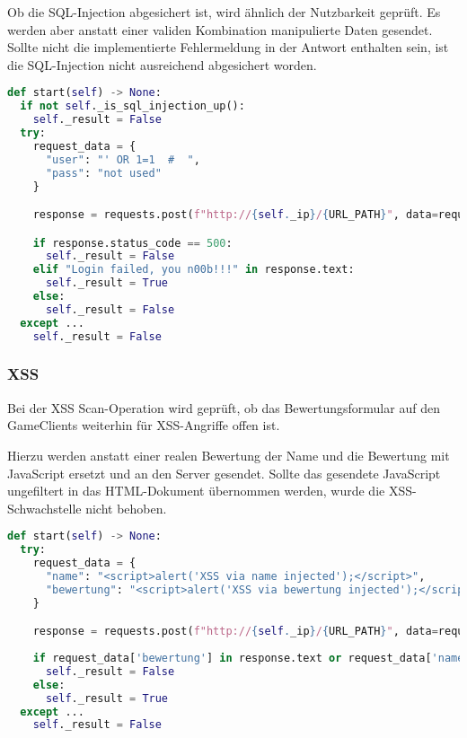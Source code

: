 Ob die SQL-Injection abgesichert ist, wird ähnlich der Nutzbarkeit geprüft. Es werden aber anstatt einer validen Kombination manipulierte Daten gesendet. Sollte nicht die implementierte Fehlermeldung  in der Antwort enthalten sein, ist die SQL-Injection nicht ausreichend abgesichert worden.

\begin{lstlisting}[language=Python, frame=single, caption={Big Brother SQL-Injection Save}, captionpos=b, label={lst:bigbrother-sql-injection-save}]
def start(self) -> None:
  if not self._is_sql_injection_up():
    self._result = False
  try:
    request_data = {
      "user": "' OR 1=1  #  ",
      "pass": "not used"
    }

    response = requests.post(f"http://{self._ip}/{URL_PATH}", data=request_data)

    if response.status_code == 500:
      self._result = False
    elif "Login failed, you n00b!!!" in response.text:
      self._result = True
    else:
      self._result = False
  except ...
    self._result = False
\end{lstlisting}

\subsubsection{XSS}
Bei der XSS Scan-Operation wird geprüft, ob das Bewertungsformular auf den GameClients weiterhin für XSS-Angriffe offen ist.

Hierzu werden anstatt einer realen Bewertung der Name und die Bewertung mit JavaScript ersetzt und an den Server gesendet. Sollte das gesendete JavaScript ungefiltert in das HTML-Dokument übernommen werden, wurde die XSS-Schwachstelle nicht behoben.
\begin{lstlisting}[language=Python, frame=single, caption={Big Brother XSS Save}, captionpos=b, label={lst:bigbrother-xss-save}]
def start(self) -> None:
  try:
    request_data = {
      "name": "<script>alert('XSS via name injected');</script>",
      "bewertung": "<script>alert('XSS via bewertung injected');</script>"
    }

    response = requests.post(f"http://{self._ip}/{URL_PATH}", data=request_data)
    
    if request_data['bewertung'] in response.text or request_data['name'] in response.text:
      self._result = False
    else:
      self._result = True
  except ...
    self._result = False
\end{lstlisting}

